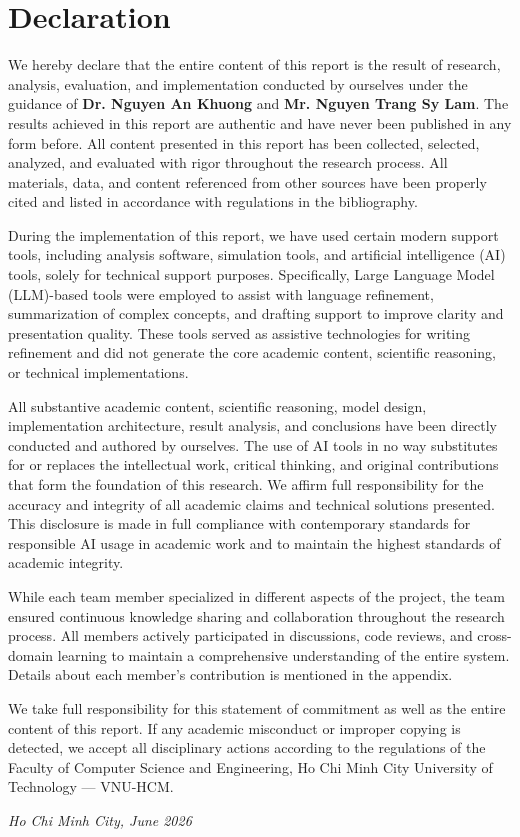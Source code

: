\chapter*{Declaration}

We hereby declare that the entire content of this report is the result of research, analysis, evaluation, and implementation conducted by ourselves under the guidance of \textbf{Dr. Nguyen An Khuong} and \textbf{Mr. Nguyen Trang Sy Lam}. The results achieved in this report are authentic and have never been published in any form before. All content presented in this report has been collected, selected, analyzed, and evaluated with rigor throughout the research process. All materials, data, and content referenced from other sources have been properly cited and listed in accordance with regulations in the bibliography.

During the implementation of this report, we have used certain modern support tools, including analysis software, simulation tools, and artificial intelligence (AI) tools, solely for technical support purposes. Specifically, Large Language Model (LLM)-based tools were employed to assist with language refinement, summarization of complex concepts, and drafting support to improve clarity and presentation quality. These tools served as assistive technologies for writing refinement and did not generate the core academic content, scientific reasoning, or technical implementations.

All substantive academic content, scientific reasoning, model design, implementation architecture, result analysis, and conclusions have been directly conducted and authored by ourselves. The use of AI tools in no way substitutes for or replaces the intellectual work, critical thinking, and original contributions that form the foundation of this research. We affirm full responsibility for the accuracy and integrity of all academic claims and technical solutions presented. This disclosure is made in full compliance with contemporary standards for responsible AI usage in academic work and to maintain the highest standards of academic integrity.

While each team member specialized in different aspects of the project, the team ensured continuous knowledge sharing and collaboration throughout the research process. All members actively participated in discussions, code reviews, and cross-domain learning to maintain a comprehensive understanding of the entire system. Details about each member's contribution is mentioned in the appendix.

We take full responsibility for this statement of commitment as well as the entire content of this report. If any academic misconduct or improper copying is detected, we accept all disciplinary actions according to the regulations of the Faculty of Computer Science and Engineering, Ho Chi Minh City University of Technology — VNU-HCM.

\begin{flushright}
\textit{Ho Chi Minh City, June 2026}
\end{flushright}

\newpage
